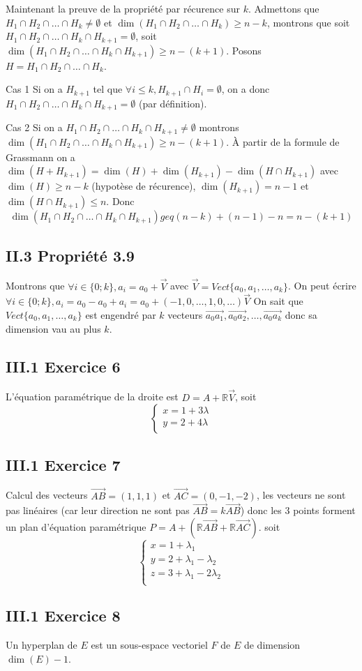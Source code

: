 \documentclass[]{book}
\theoremstyle{definition}
\newcommand{\bb}[1]{\mathbb{#1}}
\newcommand{\R}{\bb{R}}
\newcommand{\vect}[1]{\overrightarrow{#1}}
\begin{document}
Maintenant la preuve de la propri\'et\'e par r\'ecurence sur $k$. Admettons que $H_1 \cap H_2 \cap \ldots \cap H_k \neq \emptyset$ et $\dim(H_1 \cap H_2 \cap \ldots \cap H_k) \geq n - k$, montrons que soit $H_1 \cap H_2 \cap \ldots \cap H_k \cap H_{k+1} = \emptyset$, soit $\dim(H_1 \cap H_2 \cap \ldots \cap H_k \cap H_{k+1}) \geq n - (k+1)$. Posons $H = H_1 \cap H_2 \cap \ldots \cap H_k$.

Cas 1 Si on a $H_{k+1}$ tel que $\forall i \leq k, H_{k+1} \cap H_i = \emptyset$, on a donc $H_1 \cap H_2 \cap \ldots \cap H_k \cap H_{k+1} = \emptyset$ (par d\'efinition).

Cas 2 Si on a $H_1 \cap H_2 \cap \ldots \cap H_k \cap H_{k+1} \neq \emptyset$ montrons $\dim(H_1 \cap H_2 \cap \ldots \cap H_k \cap H_{k+1}) \geq n - (k+1)$. \`A partir de la formule de Grassmann on a $\dim(H+H_{k+1}) = \dim(H) + \dim(H_{k+1}) - \dim(H \cap H_{k+1})$ avec $\dim(H) \geq n -k $ (hypot\`ese de r\'ecurence), $\dim(H_{k+1}) = n-1$ et $\dim(H \cap H_{k+1}) \leq n$. Donc
$$\dim(H_1 \cap H_2 \cap \ldots \cap H_k \cap H_{k+1}) geq (n - k) + (n-1) - n = n-(k+1)$$

\subsection*{II.3 Propri\'et\'e 3.9}
Montrons que $\forall i \in \{0;k\}, a_i = a_0 + \vect{V}$ avec $\vect{V} = Vect\{a_0, a_1, \ldots, a_k\}$. On peut \'ecrire $\forall i \in \{0;k\}, a_i = a_0 - a_0 + a_i = a_0 + (-1,0, \ldots, 1, 0, \ldots)\vect{V}$ On sait que $Vect\{a_0, a_1, \ldots, a_k\}$ est engendr\'e par $k$ vecteurs $\vect{a_0a_1},\vect{a_0a_2}, \ldots, \vect{a_0a_k}$ donc sa dimension vau au plus $k$. 


\subsection*{III.1 Exercice 6}
L'\'equation param\'etrique de la droite est $D = A + \R \vect{V}$, soit
$$
\left\{
\begin{array}{l}
    x = 1 + 3\lambda\\
    y = 2 + 4\lambda\\
\end{array}
\right.
$$


\subsection*{III.1 Exercice 7}
Calcul des vecteurs $\vect{AB} = (1,1,1)$ et $\vect{AC} = (0,-1,-2)$, les vecteurs ne sont pas lin\'eaires (car leur direction ne sont pas $\vect{AB} = k\vect{AB}$) donc les 3 points forment un plan d'\'equation param\'etrique $P = A + (\R \vect{AB} + \R \vect{AC})$. soit
$$
\left\{
\begin{array}{l}
    x = 1 + \lambda_1\\
    y = 2 + \lambda_1 - \lambda_2\\
    z = 3 + \lambda_1 - 2\lambda_2 \\
\end{array}
\right.
$$

\subsection*{III.1 Exercice 8}
Un hyperplan de $E$ est un sous-espace vectoriel $F$ de $E$ de dimension $\dim(E) − 1$.
\end{document}
